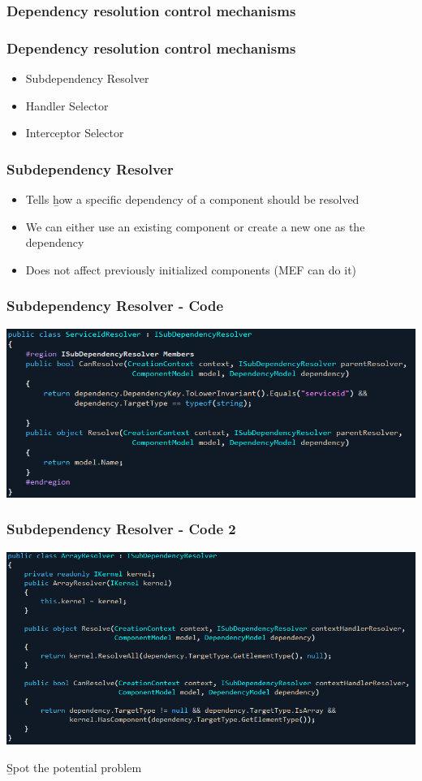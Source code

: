 \documentclass[turkish]{beamer}
\begin{document}
			\subsubsection{Dependency resolution control mechanisms}
				\frame
				{
					\frametitle{Dependency resolution control mechanisms}
			  	\begin{itemize}
			  	  \item<1->Subdependency Resolver
			  		\item<2->Handler Selector
			  		\item<3->Interceptor Selector
			  	\end{itemize}
			 }
			 	\frame
				{
					\frametitle{Subdependency Resolver}
			  	\begin{itemize}
			  	  \item<1->Tells \b{how} a specific dependency of a component should be resolved
			  		\item<2->We can either use an existing component or create a new one as the dependency
			  		\item<3->Does not affect previously initialized components (MEF can do it)
			  	\end{itemize}
			 }
			 	\frame
				{
					\frametitle{Subdependency Resolver - Code}
					\begin{center}
						\includegraphics[scale=0.40]{images/serviceidresolver.png}
					\end{center}
			  }
			 	\frame
				{
					\frametitle{Subdependency Resolver - Code 2}
					\begin{center}
						\includegraphics[scale=0.40]{images/arrayresolver.png}
					\end{center}
					\newline
					\b{Spot the potential problem}			  
				}				
\end{document}
